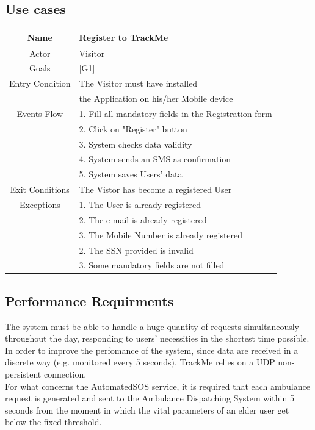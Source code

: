\documentclass[12pt,a4paper]{article}
\begin{document}
		\newpage
		\subsection{Use cases}
			\begin{center}
				\begin{tabular}{| c | l |}
					\hline
					Name & Register to TrackMe \\
					\hline
					Actor & Visitor \\
					\hline
					Goals & [G1] \\
					\hline
					Entry Condition & The Visitor must have installed \\
				                &	the Application on his/her Mobile device \\ \hline
 					Events Flow  &
 						1. Fill all mandatory fields in the Registration form\\
 						&2. Click on "Register" button\\
 						&3. System checks data validity\\
 						&4. System sends an SMS as confirmation\\
 						&5. System saves Users' data\\
 					  \hline
					Exit Conditions  & The Vistor has become a registered User \\ \hline
					Exceptions & 
					1. The User is already registered\\
					&2. The e-mail is already registered\\
					&3. The Mobile Number is already registered\\
					&2. The SSN provided is invalid\\
					&3. Some mandatory fields are not filled\\
					\hline
				\end{tabular}
			\end{center}
		
	
	\subsection{Performance Requirments}
	The system must be able to handle a huge quantity of requests simultaneously throughout the day, responding to users' necessities in the shortest time possible. In order to improve the perfomance of the system, since data are received in a discrete way (e.g. monitored every 5 seconds), TrackMe relies on a UDP non-persistent connection.\\
	For what concerns the AutomatedSOS service, it is required that each ambulance request is generated and sent to the Ambulance Dispatching System within 5 seconds from the moment in which the vital parameters of an elder user get below the fixed threshold.
	
\end{document}
